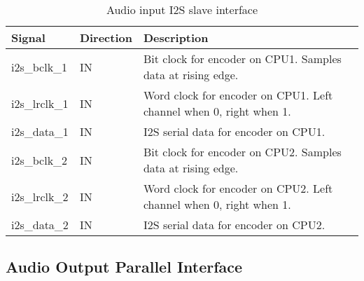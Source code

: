 \documentclass{ug}
\theoremstyle{plain}
\begin{document}
\begin{table}[H]
  \begin{center}
    \begin{tabular}{|l|l|l|}
      \hline
      \rowcolor{iob-green}
      \textbf{Signal} & \textbf{Direction} & \textbf{Description} \\
      \hline
      \hline

      i2s\_bclk\_1 & IN & Bit clock for encoder on CPU1. Samples data at rising edge.\\
      \hline

      \rowcolor{iob-blue}
      i2s\_lrclk\_1 & IN & Word clock for encoder on CPU1. Left channel when 0, right when 1.\\
      \hline

      i2s\_data\_1 & IN & I2S serial data for encoder on CPU1.\\
      \hline
      \hline

      i2s\_bclk\_2 & IN & Bit clock for encoder on CPU2. Samples data at rising edge.\\
      \hline

      \rowcolor{iob-blue}
      i2s\_lrclk\_2 & IN & Word clock for encoder on CPU2. Left channel when 0, right when 1.\\
      \hline

      i2s\_data\_2 & IN & I2S serial data for encoder on CPU2.\\
      \hline

    \end{tabular}
    \caption{Audio input I2S slave interface}
    \label{tab:i2s}
  \end{center}
\end{table}



\subsection{Audio Output Parallel Interface}
\end{document}
